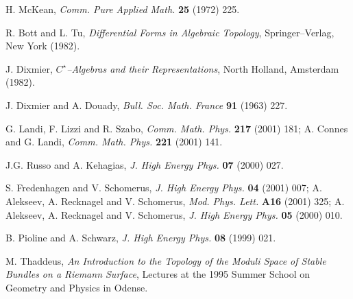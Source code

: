 \documentclass[a4paper,a4paper]{article}
\begin{document}
\begin{thebibliography}{99}
H. McKean, {\it Comm. Pure Applied Math.} {\bf 25} (1972) 225.   

R. Bott and L. Tu, {\it Differential Forms in Algebraic Topology}, 
Springer--Verlag, New York (1982). 

J. Dixmier, {\it $C^{\star}$--Algebras and their Representations}, North 
Holland, Amsterdam (1982).

J. Dixmier and A. Douady, {\it Bull. Soc. Math. France} {\bf 91} (1963) 227. 

G. Landi, F. Lizzi and R. Szabo, {\it Comm. Math. Phys.} {\bf 217} (2001) 
181; A. Connes and G. Landi, {\it Comm. Math. Phys.} {\bf 221} (2001) 141.

J.G. Russo and A. Kehagias, {\it J. High Energy Phys.} {\bf 07} (2000) 027.

S. Fredenhagen and V. Schomerus, 
{\it J. High Energy Phys.} {\bf 04} (2001) 007;
A. Alekseev, A. Recknagel and V. Schomerus, {\it Mod. Phys. Lett.} {\bf 
A16} (2001) 325;
A. Alekseev, A. Recknagel and V. Schomerus, {\it J. High Energy Phys.} 
{\bf 05} (2000) 010.

B. Pioline and A. Schwarz, {\it J. High Energy Phys.} {\bf 08} (1999) 021.

M. Thaddeus, {\it An Introduction to the Topology of the Moduli Space of 
Stable Bundles on a Riemann Surface}, Lectures at the 1995 Summer School 
on Geometry and Physics in Odense.

\end{thebibliography}  
\end{document}
